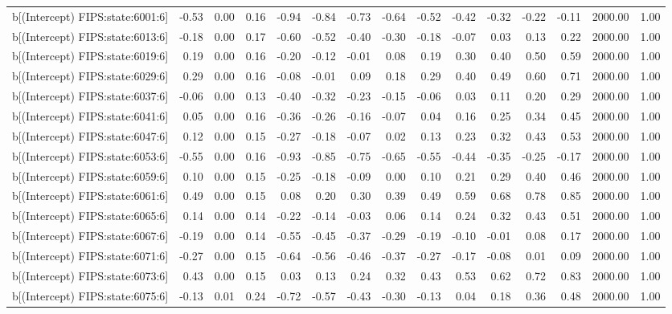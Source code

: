 \begin{table}[ht]
\begin{tabular}{rrrrrrrrrrrrrrr}
  b[(Intercept) FIPS:state:6001:6] & -0.53 & 0.00 & 0.16 & -0.94 & -0.84 & -0.73 & -0.64 & -0.52 & -0.42 & -0.32 & -0.22 & -0.11 & 2000.00 & 1.00 \\ 
  b[(Intercept) FIPS:state:6013:6] & -0.18 & 0.00 & 0.17 & -0.60 & -0.52 & -0.40 & -0.30 & -0.18 & -0.07 & 0.03 & 0.13 & 0.22 & 2000.00 & 1.00 \\ 
  b[(Intercept) FIPS:state:6019:6] & 0.19 & 0.00 & 0.16 & -0.20 & -0.12 & -0.01 & 0.08 & 0.19 & 0.30 & 0.40 & 0.50 & 0.59 & 2000.00 & 1.00 \\ 
  b[(Intercept) FIPS:state:6029:6] & 0.29 & 0.00 & 0.16 & -0.08 & -0.01 & 0.09 & 0.18 & 0.29 & 0.40 & 0.49 & 0.60 & 0.71 & 2000.00 & 1.00 \\ 
  b[(Intercept) FIPS:state:6037:6] & -0.06 & 0.00 & 0.13 & -0.40 & -0.32 & -0.23 & -0.15 & -0.06 & 0.03 & 0.11 & 0.20 & 0.29 & 2000.00 & 1.00 \\ 
  b[(Intercept) FIPS:state:6041:6] & 0.05 & 0.00 & 0.16 & -0.36 & -0.26 & -0.16 & -0.07 & 0.04 & 0.16 & 0.25 & 0.34 & 0.45 & 2000.00 & 1.00 \\ 
  b[(Intercept) FIPS:state:6047:6] & 0.12 & 0.00 & 0.15 & -0.27 & -0.18 & -0.07 & 0.02 & 0.13 & 0.23 & 0.32 & 0.43 & 0.53 & 2000.00 & 1.00 \\ 
  b[(Intercept) FIPS:state:6053:6] & -0.55 & 0.00 & 0.16 & -0.93 & -0.85 & -0.75 & -0.65 & -0.55 & -0.44 & -0.35 & -0.25 & -0.17 & 2000.00 & 1.00 \\ 
  b[(Intercept) FIPS:state:6059:6] & 0.10 & 0.00 & 0.15 & -0.25 & -0.18 & -0.09 & 0.00 & 0.10 & 0.21 & 0.29 & 0.40 & 0.46 & 2000.00 & 1.00 \\ 
  b[(Intercept) FIPS:state:6061:6] & 0.49 & 0.00 & 0.15 & 0.08 & 0.20 & 0.30 & 0.39 & 0.49 & 0.59 & 0.68 & 0.78 & 0.85 & 2000.00 & 1.00 \\ 
  b[(Intercept) FIPS:state:6065:6] & 0.14 & 0.00 & 0.14 & -0.22 & -0.14 & -0.03 & 0.06 & 0.14 & 0.24 & 0.32 & 0.43 & 0.51 & 2000.00 & 1.00 \\ 
  b[(Intercept) FIPS:state:6067:6] & -0.19 & 0.00 & 0.14 & -0.55 & -0.45 & -0.37 & -0.29 & -0.19 & -0.10 & -0.01 & 0.08 & 0.17 & 2000.00 & 1.00 \\ 
  b[(Intercept) FIPS:state:6071:6] & -0.27 & 0.00 & 0.15 & -0.64 & -0.56 & -0.46 & -0.37 & -0.27 & -0.17 & -0.08 & 0.01 & 0.09 & 2000.00 & 1.00 \\ 
  b[(Intercept) FIPS:state:6073:6] & 0.43 & 0.00 & 0.15 & 0.03 & 0.13 & 0.24 & 0.32 & 0.43 & 0.53 & 0.62 & 0.72 & 0.83 & 2000.00 & 1.00 \\ 
  b[(Intercept) FIPS:state:6075:6] & -0.13 & 0.01 & 0.24 & -0.72 & -0.57 & -0.43 & -0.30 & -0.13 & 0.04 & 0.18 & 0.36 & 0.48 & 2000.00 & 1.00 \\ 

\end{tabular}
\end{table}
